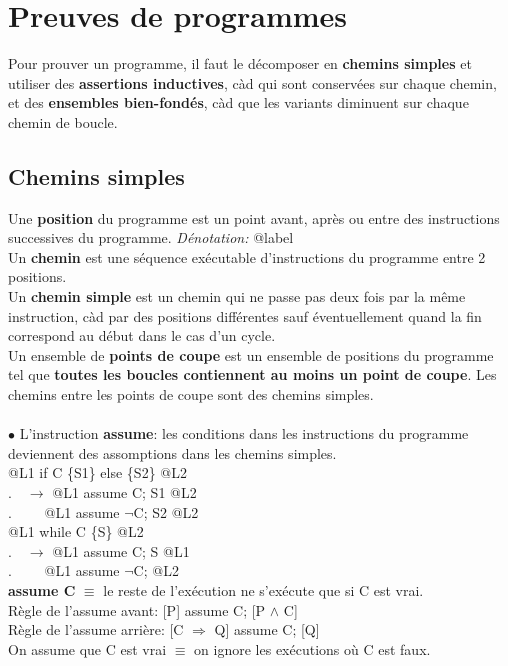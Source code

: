 \section{Preuves de programmes}

Pour prouver un programme, il faut le décomposer en \textbf{chemins simples} et utiliser des \textbf{assertions inductives}, càd qui sont conservées sur chaque chemin, et des \textbf{ensembles bien-fondés}, càd que les variants diminuent sur chaque chemin de boucle.
\subsection{Chemins simples}
Une \textbf{position} du programme est un point avant, après ou entre des instructions successives du programme. \textit{Dénotation:} @label\\

Un \textbf{chemin} est une séquence exécutable d'instructions du programme entre 2 positions.\\

Un \textbf{chemin simple} est un chemin qui ne passe pas deux fois par la même instruction, càd par des positions différentes sauf éventuellement quand la fin correspond au début dans le cas d'un cycle.\\

Un ensemble de \textbf{points de coupe} est un ensemble de positions du programme tel que \textbf{toutes les boucles contiennent au moins un point de coupe}. Les chemins entre les points de coupe sont des chemins simples.\\ \vspace{5mm}\\

$\bullet$ L'instruction \textbf{assume}: les conditions dans les instructions du programme deviennent des assomptions dans les chemins simples.\\
@L1 if C \{S1\} else \{S2\} @L2\\
$.\quad \rightarrow$ @L1 assume C; S1 @L2\\
$.\quad \quad$ @L1 assume $\neg$C; S2 @L2\\
@L1 while C \{S\} @L2\\
$.\quad \rightarrow$ @L1 assume C; S @L1\\
$.\quad \quad$ @L1 assume $\neg$C; @L2\\ 

\textbf{assume C} $\equiv$ le reste de l'exécution ne s'exécute que si C est vrai.\\
Règle de l'assume avant: [P] assume C; [P $\wedge$ C]\\
Règle de l'assume arrière: [C $\Rightarrow$ Q] assume C; [Q]\\
On assume que C est vrai $\equiv$ on ignore les exécutions où C est faux.\\ \vspace{5mm}\\

